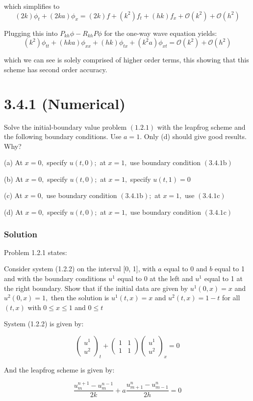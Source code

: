 \documentclass[12pt]{article}
\begin{document}
\noindent which simplifies to
$$ (2k)\phi_t + (2ka)\phi_x = (2k)f + (k^2)f_t + (hk)f_x +\mathcal{O}(k^2)+ \mathcal{O}(h^2)$$

\noindent Plugging this into $P_{kh}\phi - R_{kh}P\phi$ for the one-way wave equation yields:
$$ (k^2)\phi_{tt} + (hka)\phi_{xx} + (hk)\phi_{tx}+ (k^2a)\phi_{xt}= \mathcal{O}(k^2)+ \mathcal{O}(h^2)$$

\noindent which we can see is solely comprised of higher order terms, this showing that this scheme has second order accuracy.


\pagebreak
\section*{3.4.1 (Numerical)}
Solve the initial-boundary value problem $(1.2 .1)$ with the leapfrog scheme and the following boundary conditions. Use $a=1 .$ Only (d) should give good results. Why?

(a) At $x=0,$ specify $u(t, 0) ;$ at $x=1,$ use boundary condition $(3.4 .1 \mathrm{b})$

(b) At $x=0,$ specify $u(t, 0) ;$ at $x=1,$ specify $u(t, 1)=0$

(c) At $x=0,$ use boundary condition $(3.4 .1 \mathrm{b}) ;$ at $x=1,$ use $(3.4 .1 \mathrm{c})$

(d) At $x=0,$ specify $u(t, 0) ;$ at $x=1,$ use boundary condition $(3.4 .1 \mathrm{c})$

\subsubsection*{Solution}

Problem 1.2.1 states:

Consider system (1.2.2) on the interval [0, 1], with $a$ equal to 0 and $b$ equal to 1 and with the boundary conditions $u^{1}$ equal to 0 at the left and $u^{1}$ equal to 1 at the right boundary. Show that if the initial data are given by $u^{1}(0, x)=x$ and $u^{2}(0, x)=1,$ then the solution is $u^{1}(t, x)=x$ and $u^{2}(t, x)=1-t$ for all $(t, x)$ with $0 \leq x \leq 1$ and $0 \leq t$

System (1.2.2) is given by:

$$
\left(\begin{array}{l}
u^{1} \\
u^{2}
\end{array}\right)_{t}+\left(\begin{array}{ll}
1 & 1 \\
1 & 1
\end{array}\right)\left(\begin{array}{l}
u^{1} \\
u^{2}
\end{array}\right)_{x}=0
$$

And the leapfrog scheme is given by:

$$
\frac{u_{m}^{n+1}-u_{m}^{n-1}}{2 k}+a \frac{u_{m+1}^{n}-u_{m-1}^{n}}{2 h}=0
$$
\end{document}
